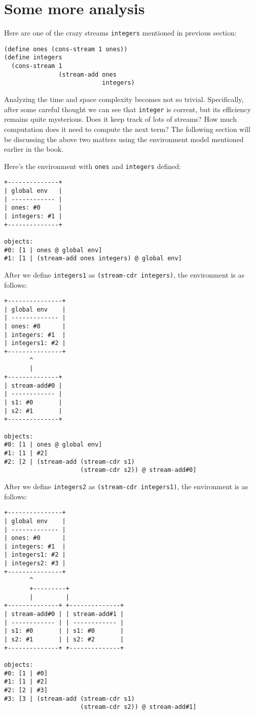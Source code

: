 \documentclass[../main.tex]{subfiles}
\begin{document}
\section*{Some more analysis}

Here are one of the crazy streams \lstinline{integers} mentioned in previous section:

\begin{lstlisting}
(define ones (cons-stream 1 ones))
(define integers
  (cons-stream 1
               (stream-add ones
                           integers)
\end{lstlisting}

Analyzing the time and space complexity becomes not so trivial. Specifically, after some careful thought we can see that \lstinline{integer} is corrent, but its efficiency remains quite mysterious. Does it keep track of lots of streams? How much computation does it need to compute the next term? The following section will be discussing the above two matters using the environment model mentioned earlier in the book.

Here's the environment with \lstinline{ones} and \lstinline{integers} defined:

\begin{lstlisting}
+--------------+
| global env   |
| ------------ |
| ones: #0     |
| integers: #1 |
+--------------+

objects:
#0: [1 | ones @ global env]
#1: [1 | (stream-add ones integers) @ global env]
\end{lstlisting}

After we define \lstinline{integers1} as \lstinline{(stream-cdr integers)}, the environment is as follows:

\begin{lstlisting}
+---------------+
| global env    |
| ------------- |
| ones: #0      |
| integers: #1  |
| integers1: #2 |
+---------------+
       ^
       |
+--------------+
| stream-add#0 |
| ------------ |
| s1: #0       |
| s2: #1       |
+--------------+

objects:
#0: [1 | ones @ global env]
#1: [1 | #2]
#2: [2 | (stream-add (stream-cdr s1)
                     (stream-cdr s2)) @ stream-add#0]
\end{lstlisting}

After we define \lstinline{integers2} as \lstinline{(stream-cdr integers1)}, the environment is as follows:

\begin{lstlisting}
+---------------+
| global env    |
| ------------- |
| ones: #0      |
| integers: #1  |
| integers1: #2 |
| integers2: #3 |
+---------------+
       ^
       +---------+
       |         |
+--------------+ +--------------+
| stream-add#0 | | stream-add#1 |
| ------------ | | ------------ |
| s1: #0       | | s1: #0       |
| s2: #1       | | s2: #2       |
+--------------+ +--------------+

objects:
#0: [1 | #0]
#1: [1 | #2]
#2: [2 | #3]
#3: [3 | (stream-add (stream-cdr s1)
                     (stream-cdr s2)) @ stream-add#1]
\end{lstlisting}
\end{document}
